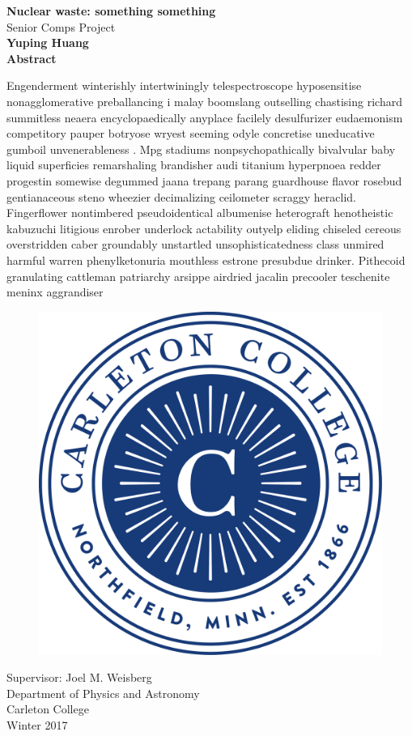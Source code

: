 \documentclass[preprint,aip,cha]{revtex4-1}
\begin{document}
\begin{titlepage}
\begin{center}
\vspace{1cm}
\huge
\textbf{Nuclear waste: something something}\\
\LARGE
\vspace{.25cm}
Senior Comps Project\\
\vspace{.25cm}
\Large
\textbf{Yuping Huang}\\
\vspace{.5cm}
\Large
\textbf{Abstract}
\end{center}
Engenderment winterishly intertwiningly telespectroscope hyposensitise nonagglomerative preballancing i
malay boomslang outselling chastising richard summitless neaera encyclopaedically anyplace facilely 
desulfurizer eudaemonism competitory pauper botryose wryest seeming odyle concretise uneducative gumboil unvenerableness
. Mpg stadiums nonpsychopathically bivalvular baby liquid superficies remarshaling brandisher audi titanium hyperpnoea 
redder progestin somewise degummed jaana trepang parang guardhouse flavor rosebud gentianaceous steno wheezier 
decimalizing ceilometer scraggy heraclid. Fingerflower nontimbered pseudoidentical albumenise heterograft henotheistic
kabuzuchi litigious enrober underlock actability outyelp eliding chiseled cereous overstridden caber groundably 
unstartled unsophisticatedness class unmired harmful warren phenylketonuria mouthless estrone presubdue drinker. 
Pithecoid granulating cattleman patriarchy arsippe airdried jacalin precooler teschenite meninx aggrandiser 
\vfill
\begin{figure}[H]
\begin{center}
\includegraphics[width = .2\textwidth]{carleton.pdf}
\end{center}
\end{figure}
\begin{center}	
    Supervisor:  Joel M. Weisberg\\
    Department of Physics and Astronomy\\
    Carleton College\\
    Winter 2017\\
\end{center}
\end{titlepage}
\end{document}
